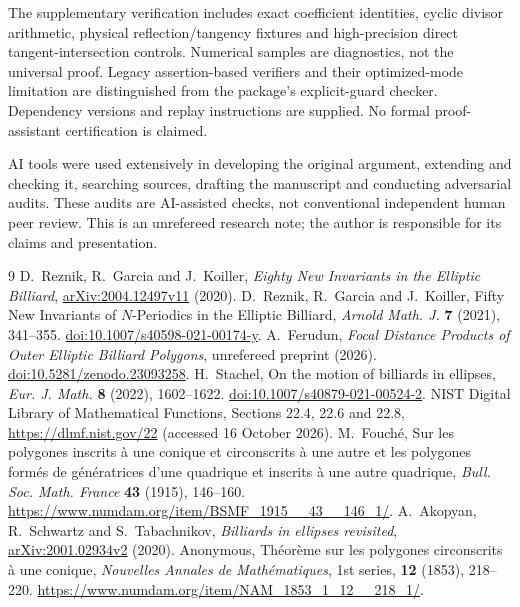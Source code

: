 \documentclass[11pt]{article}
\begin{document}
The supplementary verification includes exact coefficient identities,
cyclic divisor arithmetic, physical reflection/tangency fixtures and
high-precision direct tangent-intersection controls. Numerical samples
are diagnostics, not the universal proof. Legacy assertion-based
verifiers and their optimized-mode limitation are distinguished from
the package's explicit-guard checker. Dependency versions and replay
instructions are supplied. No formal proof-assistant certification is
claimed.

AI tools were used extensively in developing the original argument,
extending and checking it, searching sources, drafting the manuscript
and conducting adversarial audits. These audits are AI-assisted checks,
not conventional independent human peer review. This is an unrefereed
research note; the author is responsible for its claims and presentation.

\begin{thebibliography}{9}
 D.~Reznik, R.~Garcia and J.~Koiller,
\emph{Eighty New Invariants in the Elliptic Billiard},
\href{https://arxiv.org/abs/2004.12497v11}{arXiv:2004.12497v11} (2020).
 D.~Reznik, R.~Garcia and J.~Koiller,
Fifty New Invariants of $N$-Periodics in the Elliptic Billiard,
\emph{Arnold Math. J.} \textbf{7} (2021), 341--355.
\href{https://doi.org/10.1007/s40598-021-00174-y}{doi:10.1007/s40598-021-00174-y}.
 A.~Ferudun,
\emph{Focal Distance Products of Outer Elliptic Billiard Polygons},
unrefereed preprint (2026).
\href{https://doi.org/10.5281/zenodo.23093258}{doi:10.5281/zenodo.23093258}.
 H.~Stachel, On the motion of billiards in ellipses,
\emph{Eur. J. Math.} \textbf{8} (2022), 1602--1622.
\href{https://doi.org/10.1007/s40879-021-00524-2}{doi:10.1007/s40879-021-00524-2}.
 NIST Digital Library of Mathematical Functions,
Sections 22.4, 22.6 and 22.8,
\url{https://dlmf.nist.gov/22} (accessed 16 October 2026).
 M.~Fouch\'e, Sur les polygones inscrits \`a une conique
et circonscrits \`a une autre et les polygones form\'es de g\'en\'eratrices
d'une quadrique et inscrits \`a une autre quadrique,
\emph{Bull. Soc. Math. France} \textbf{43} (1915), 146--160.
\url{https://www.numdam.org/item/BSMF_1915__43__146_1/}.
 A.~Akopyan, R.~Schwartz and S.~Tabachnikov,
\emph{Billiards in ellipses revisited},
\href{https://arxiv.org/abs/2001.02934v2}{arXiv:2001.02934v2} (2020).
 Anonymous, Th\'eor\`eme sur les polygones
circonscrits \`a une conique, \emph{Nouvelles Annales de Math\'ematiques},
1st series, \textbf{12} (1853), 218--220.
\url{https://www.numdam.org/item/NAM_1853_1_12__218_1/}.
\end{thebibliography}
\end{document}
